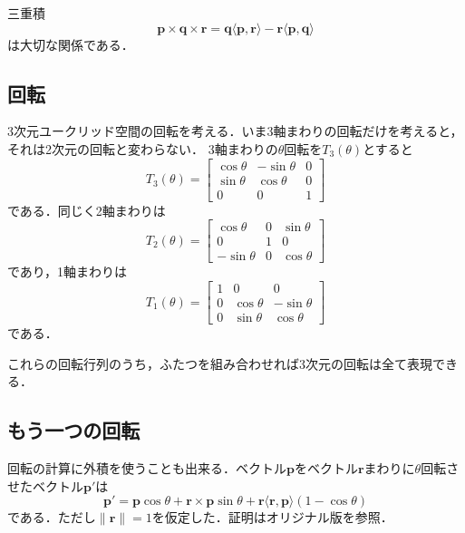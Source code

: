 \documentclass{jsbook}
\newcommand{\norm}[1]{\|{#1}\|}
\newcommand{\bvec}[1]{\boldsymbol{#1}}
\begin{document}
三重積
\begin{equation}
\bvec{p}\times\bvec{q}\times\bvec{r}=\bvec{q}\langle\bvec{p},\bvec{r}\rangle-\bvec{r}\langle\bvec{p},\bvec{q}\rangle
\end{equation}
は大切な関係である．

\subsection{回転}

3次元ユークリッド空間の回転を考える．いま3軸まわりの回転だけを考えると，それは2次元の回転と変わらない．
3軸まわりの$\theta$回転を$T_3(\theta)$とすると
\begin{equation}
T_3(\theta)=\begin{bmatrix}\cos\theta&-\sin\theta&0\\\sin\theta&\cos\theta&0\\0&0&1\end{bmatrix}
\end{equation}
である．同じく2軸まわりは
\begin{equation}
T_2(\theta)=\begin{bmatrix}\cos\theta&0&\sin\theta\\0&1&0\\-\sin\theta&0&\cos\theta\end{bmatrix}
\end{equation}
であり，1軸まわりは
\begin{equation}
T_1(\theta)=\begin{bmatrix}1&0&0\\0&\cos\theta&-\sin\theta\\0&\sin\theta&\cos\theta\end{bmatrix}
\end{equation}
である．

これらの回転行列のうち，ふたつを組み合わせれば3次元の回転は全て表現できる．

\subsection{もう一つの回転}

回転の計算に外積を使うことも出来る．ベクトル$\bvec{p}$をベクトル$\bvec{r}$まわりに$\theta$回転させたベクトル$\bvec{p}'$は
\begin{equation}
\bvec{p}'=\bvec{p}\cos\theta+\bvec{r}\times\bvec{p}\sin\theta+\bvec{r}\langle\bvec{r},\bvec{p}\rangle(1-\cos\theta)
\end{equation}
である．ただし$\norm{\bvec{r}}=1$を仮定した．証明はオリジナル版を参照．
\end{document}
